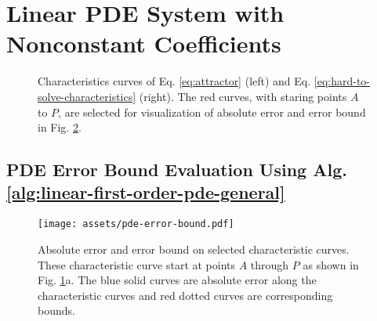 \section{Linear PDE System with Nonconstant Coefficients } \label{section:experiment-attractor}
    \begin{figure}[!ht]
        \centering
        \caption{
            Characteristics curves of Eq. \eqref{eq:attractor} (left) and Eq. \eqref{eq:hard-to-solve-characteristics} (right). 
            The red curves, with staring points $A$ to $P$, are selected for visualization of absolute error and error bound in Fig. \ref{fig:pde-error-bound}.
        }\label{fig:characteristics}
    \end{figure}

\subsection{PDE Error Bound Evaluation Using Alg. \ref{alg:linear-first-order-pde-general}}
    \begin{figure}[!ht]
        \centering
        \texttt{[image: assets/pde-error-bound.pdf]}
        \caption{
            Absolute error and error bound on selected characteristic curves. 
            These characteristic curve start at points $A$ through $P$ as shown in Fig. \ref{fig:characteristics}a.
            The blue solid curves are absolute error along the characteristic curves and red dotted curves are corresponding bounds.
        }\label{fig:pde-error-bound}
    \end{figure}

